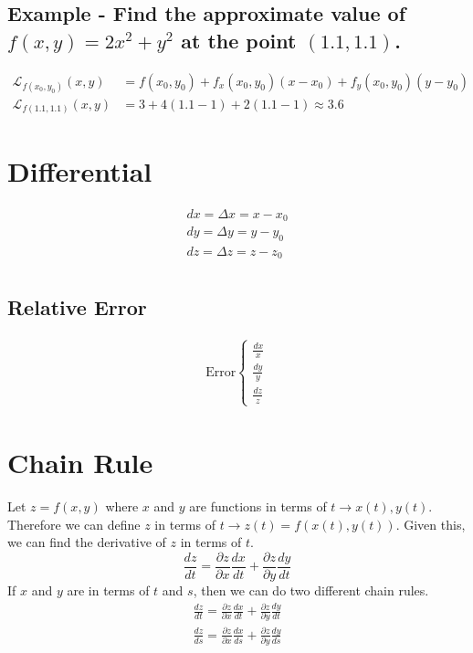 \documentclass{article}
\begin{document}
    \subsection{Example - Find the approximate value of $f(x, y) = 2x^2 + y^2$ at the point $(1.1,1.1)$.}
    \[
    \begin{aligned}
    \mathcal{L}_{f(x_0, y_0)}(x, y) &= f(x_0, y_0) + f_x(x_0, y_0)(x - x_0) + f_y(x_0, y_0)(y - y_0)\\
    \mathcal{L}_{f(1.1, 1.1)}(x, y) &= 3 + 4(1.1-1) + 2(1.1-1) \approx 3.6
    \end{aligned}
    \]
\section{Differential}
\begin{equation}
\begin{aligned}
dx = \Delta x = x - x_0\\
dy = \Delta y = y - y_0\\
dz = \Delta z = z - z_0\\
\end{aligned}
\end{equation}
    \subsection{Relative Error}
    \begin{equation}
    \begin{aligned}
    \text{Error}
    \begin{cases}
    \frac{dx}{x}\\
    \frac{dy}{y}\\
    \frac{dz}{z}
    \end{cases}
    \end{aligned}
    \end{equation}
\section{Chain Rule}
Let $ z = f(x, y) $ where $x$ and $y$ are functions in terms of $t \to x(t),y(t)$. Therefore we can define $z$ in terms of $t \to z(t)=f(x(t), y(t))$. Given this, we can find the derivative of $z$ in terms of $t$.
\begin{equation}
\frac{dz}{dt} = \frac{\partial z}{\partial x} \frac{dx}{dt} + \frac{\partial z}{\partial y} \frac{dy}{dt}
\end{equation}
If $x$ and $y$ are in terms of $t$ and $s$, then we can do two different chain rules.
\begin{equation}
\begin{aligned}
\frac{dz}{dt} = \frac{\partial z}{\partial x} \frac{dx}{dt} + \frac{\partial z}{\partial y} \frac{dy}{dt}\\
\frac{dz}{ds} = \frac{\partial z}{\partial x} \frac{dx}{ds} + \frac{\partial z}{\partial y} \frac{dy}{ds}
\end{aligned}
\end{equation}
\end{document}
